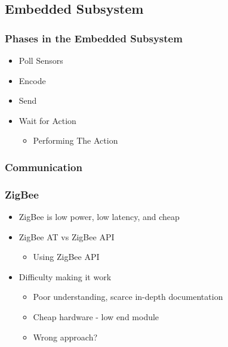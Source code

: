 \subsection{Embedded Subsystem}
  \begin{frame}

	\frametitle{Phases in the Embedded Subsystem}
  	\begin{itemize}
  		\item Poll Sensors
  		\item Encode
  		\item Send
  		\item Wait for Action
        \begin{itemize}
            \item Performing The Action
        \end{itemize}
  	\end{itemize}
  \end{frame}
  

\subsubsection{Communication}
  \begin{frame}
  	\frametitle{ZigBee}
  	\begin{itemize}
  		\item ZigBee is low power, low latency, and cheap
  		\item ZigBee AT vs ZigBee API

        \begin{itemize}
            \item Using ZigBee API
        \end{itemize}
  		\item Difficulty making it work
        \begin{itemize}
            \item Poor understanding, scarce in-depth documentation
            \item Cheap hardware - low end module
            \item Wrong approach?
        \end{itemize}
  	\end{itemize}
  \end{frame}
  

